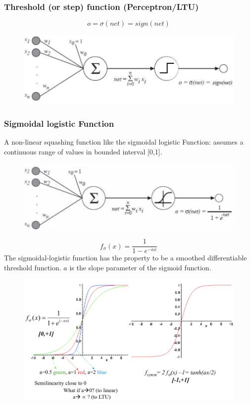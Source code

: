 \documentclass[../main.tex]{subfiles}
\begin{document}
\subsubsection{Threshold (or step) function (Perceptron/LTU)}
    $$ o = \sigma(net) =  sign(net)$$
    \begin{figure}[H]
        \centering
        \includegraphics[scale = 0.3]{lectures/4_neural_networks/4_activation_function_ltu.png}
    \end{figure}
\subsubsection{Sigmoidal logistic Function}
A non-linear squashing function like the sigmoidal logistic Function: assumes a continuous range of values in bounded interval [0,1].
    \begin{figure}[H]
        \centering
        \includegraphics[scale = 0.3]{lectures/4_neural_networks/4_activation_function_sigmoid.png}
    \end{figure}
$$ f_{\sigma}(x) =  \frac{1}{1 - e^{-ax}}$$
The sigmoidal-logistic function has the property to be a smoothed differentiable threshold function. $a$ is the slope parameter of the sigmoid function.
\begin{figure}[H]
    \centering
    \includegraphics[scale = 0.4]{lectures/4_neural_networks/4_act_func_sig_two.png}
\end{figure}
\end{document}
